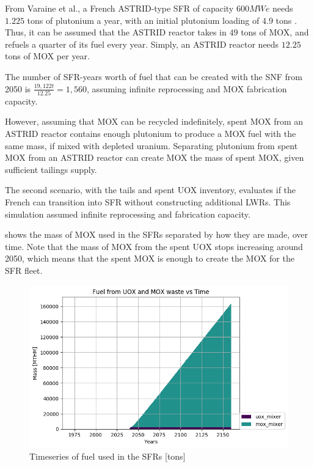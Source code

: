 From Varaine et al., a French
ASTRID-type \gls{SFR} of capacity $600 MWe$ needs $1.225$ tons of
plutonium a year, with an initial plutonium loading of $4.9$ tons
\cite{marsaultmarie-sophie_pre-conceptual_2012}.
Thus, it can be assumed that the ASTRID reactor takes in $49$ tons of 
\gls{MOX}, and refuels a quarter of its fuel every year. Simply,
an ASTRID reactor needs $12.25$ tons of \gls{MOX} per year. 

The number of SFR-years worth of fuel that can be created with
the \gls{SNF} from 2050 is $\frac{19,122t}{12.25} = 1,560 $,
assuming infinite reprocessing and \gls{MOX} fabrication capacity.

However, assuming that \gls{MOX} can be recycled indefinitely,
spent \gls{MOX} from an ASTRID reactor
contains enough plutonium to produce a \gls{MOX} fuel with
the same mass, if mixed with depleted uranium. 
Separating plutonium from spent \gls{MOX} from
an ASTRID reactor can create \gls{MOX} 
the mass of spent \gls{MOX}, given sufficient tailings supply.

The second scenario, with the tails and spent \gls{UOX}
inventory, evaluates if the French can transition into \gls{SFR}
without constructing additional \gls{LWR}s. This simulation
assumed infinite reprocessing and fabrication capacity.

 shows the mass of \gls{MOX} used in the 
\gls{SFR}s separated by how they are made, over time.
Note that the mass of \gls{MOX} from the spent \gls{UOX}
stops increasing around 2050, which means that the spent
\gls{MOX} is enough to create the \gls{MOX} for the
\gls{SFR} fleet. 

\begin{figure}[htbp!]
	\begin{center}
		\includegraphics[width=\columnwidth]{./images/french-transition/where_fuel.png}
	\end{center}
	\caption{Timeseries of fuel used in the \gls{SFR}s [tons]}
	\label{fig:fuel}
\end{figure}


